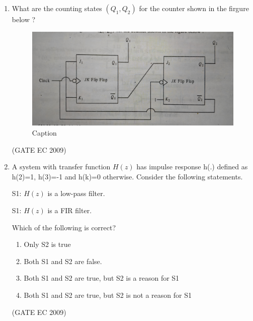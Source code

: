 \documentclass[journal,12pt,onecolumn]{IEEEtran}
\theoremstyle{remark}
\begin{document}
\begin{enumerate}[start=1, label={Q\arabic*.}]
\item What are the counting states $(Q_1, Q_2)$ for the counter shown in the firgure below ?
\begin{figure}[H]
    \centering
    \includegraphics[width=0.5\linewidth]{images/img_17.jpg}
    \caption{Caption}
    \label{fig:placeholder}
\end{figure}
\begin{enumerate}[label=(\Alph*)]
\end{enumerate}
\hfill (GATE EC 2009)

\item A system with transfer function $H(z)$ has impulse response h(.) defined as h(2)=1, h(3)=-1 and h(k)=0 otherwise. Consider the following statements.
\begin{center}
    S1: $H(z)$ is a low-pass filter.

    S1: $H(z)$ is a FIR filter.
\end{center}
Which of the following is correct?
\begin{enumerate}[label=(\Alph*)]
        \item Only S2 is true
        \item Both S1 and S2 are false.
        \item Both S1 and S2 are true, but S2 is a reason for S1
        \item Both S1 and S2 are true, but S2 is not a reason for S1
\end{enumerate}
\hfill (GATE EC 2009)


\end{enumerate}
\end{document}

